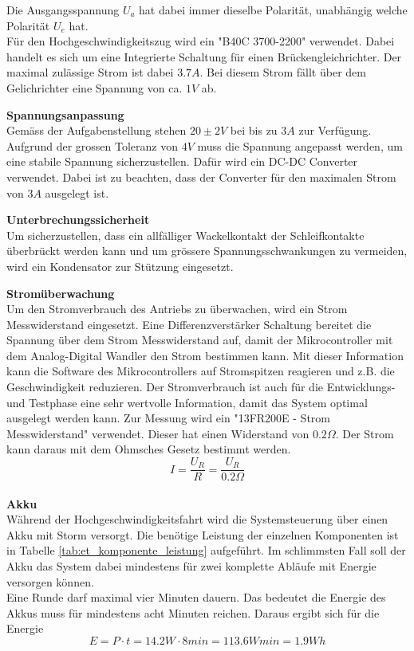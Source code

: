 \documentclass[../../main.tex]{subfiles}
\begin{document}
    Die Ausgangsspannung $U_a$ hat dabei immer dieselbe Polarität, unabhängig welche Polarität $U_e$ hat. \\
    Für den Hochgeschwindigkeitszug wird ein "B40C 3700-2200"  verwendet. Dabei handelt es sich um eine Integrierte Schaltung für einen Brückengleichrichter. Der maximal zulässige Strom ist dabei $3.7A$. Bei diesem Strom fällt über dem Gelichrichter eine Spannung von ca. $1V$ ab.

    \textbf{Spannungsanpassung}\\
    Gemäss der Aufgabenstellung stehen $20\pm2V$ bei bis zu $3A$ zur Verfügung. Aufgrund der grossen Toleranz von $4V$ muss die Spannung angepasst werden, um eine stabile Spannung sicherzustellen. Dafür wird ein DC-DC Converter verwendet. Dabei ist zu beachten, dass der Converter für den maximalen Strom von $3A$ ausgelegt ist.

    \textbf{Unterbrechungssicherheit}\\
    Um sicherzustellen, dass ein allfälliger Wackelkontakt der Schleifkontakte überbrückt werden kann und um grössere Spannungsschwankungen zu vermeiden, wird ein Kondensator zur Stützung eingesetzt.

    \textbf{Stromüberwachung}\\
    Um den Stromverbrauch des Antriebs zu überwachen, wird ein Strom Messwiderstand eingesetzt. Eine
    Differenzverstärker Schaltung bereitet die Spannung über dem Strom Messwiderstand auf, damit der Mikrocontroller mit
    dem Analog-Digital Wandler den Strom bestimmen kann. Mit dieser Information kann die Software des Mikrocontrollers
    auf Stromspitzen reagieren und z.B. die Geschwindigkeit reduzieren. Der Stromverbrauch ist auch für die Entwicklungs-
    und Testphase eine sehr wertvolle Information, damit das System optimal ausgelegt werden kann.
    Zur Messung wird ein "13FR200E - Strom Messwiderstand" verwendet. Dieser hat einen Widerstand von $0.2\Omega$. Der Strom kann daraus mit dem Ohmsches Gesetz bestimmt werden. $$I=\frac{U_R}{R}=\frac{U_R}{0.2\Omega} $$
    \\
    \textbf{Akku}\\
    Während der Hochgeschwindigkeitsfahrt wird die Systemsteuerung über einen Akku mit Storm versorgt. Die benötige Leistung der einzelnen Komponenten ist in Tabelle \ref{tab:et_komponente_leistung} aufgeführt. Im schlimmsten Fall soll der Akku das System dabei mindestens für zwei komplette Abläufe mit Energie versorgen können.\\
    Eine Runde darf maximal vier Minuten dauern. Das bedeutet die Energie des Akkus muss für mindestens acht Minuten reichen. Daraus ergibt sich für die Energie $$E=P\cdot t = 14.2W \cdot 8min = 113.6Wmin = 1.9Wh$$
\end{document}
